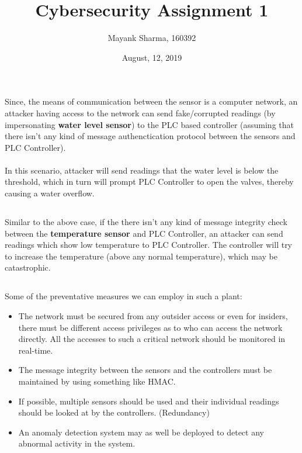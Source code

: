 \documentclass[12pt, a4paper]{article}
\title{Cybersecurity Assignment 1}
\author{Mayank Sharma, 160392}
\date{August, 12, 2019}
\begin{document}
\renewcommand{\v}{\textbf}
\maketitle
\section{}

\subsection{}
Since, the means of communication between the sensor is a computer network, an attacker having access to the network can send fake/corrupted readings (by impersonating \textbf{water level sensor}) to the PLC based controller (assuming that there isn't any kind of message authenctication protocol between the sensors and PLC Controller). \\ \\
In this scenario, attacker will send readings that the water level is below the threshold, which in turn will prompt PLC Controller to open the valves, thereby causing a water overflow.

\subsection{}
Similar to the above case, if the there isn't any kind of message integrity check between the \textbf{temperature sensor} and PLC Controller, an attacker can send readings which show low temperature to PLC Controller. The controller will try to increase the temperature (above any normal temperature), which may be catastrophic.

\subsection{}
Some of the preventative measures we can employ in such a plant:
\begin{itemize}
    \item The network must be secured from any outsider access or even for insiders, there must be different access privileges as to who can access the network directly. All the accesses to such a critical network should be monitored in real-time.
    \item The message integrity between the sensors and the controllers must be maintained by using something like HMAC.
    \item If possible, multiple sensors should be used and their individual readings should be looked at by the controllers. (Redundancy)
    \item An anomaly detection system may as well be deployed to detect any abnormal activity in the system.
\end{itemize}
\newpage
\end{document}
